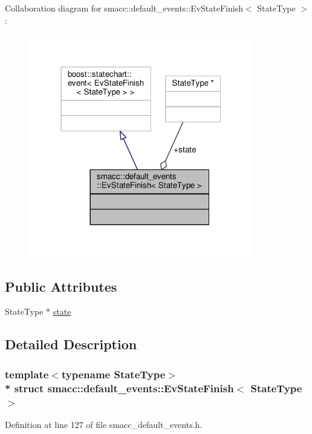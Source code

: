 Collaboration diagram for smacc\+:\+:default\+\_\+events\+:\+:Ev\+State\+Finish$<$ State\+Type $>$\+:\nopagebreak
\begin{figure}[H]
\begin{center}
\leavevmode
\includegraphics[width=278pt]{structsmacc_1_1default__events_1_1EvStateFinish__coll__graph}
\end{center}
\end{figure}
\subsection*{Public Attributes}
\begin{DoxyCompactItemize}
\item 
State\+Type $\ast$ \hyperlink{structsmacc_1_1default__events_1_1EvStateFinish_ad598cccf2b8ddb507f3c0efba2232d62}{state}
\end{DoxyCompactItemize}


\subsection{Detailed Description}
\subsubsection*{template$<$typename State\+Type$>$\\*
struct smacc\+::default\+\_\+events\+::\+Ev\+State\+Finish$<$ State\+Type $>$}



Definition at line 127 of file smacc\+\_\+default\+\_\+events.\+h.



